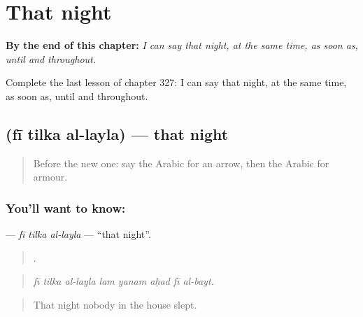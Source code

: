 
\chapter{That night}
\label{ch:ar-that-night}

\begin{chapteropening}
\textbf{By the end of this chapter:} \emph{I can say that night, at the same time, as soon as, until and throughout.}

Complete the last lesson of chapter 327: I can say that night, at the same time, as soon as, until and throughout.
\end{chapteropening}

\section[\texorpdfstring{\ar{في} \ar{تلك} \ar{الليلة} (fī tilka al-layla)}{في تلك الليلة (fī tilka al-layla)}]{   (fī tilka al-layla) — that night}

\label{lesson:AR-C327-fi-tilka-al-layla}



\begin{quote}
Before the new one: say the Arabic for an arrow, then the Arabic for armour.
\end{quote}

\subsection*{You'll want to know:   }
\textbf{  } — \emph{fī tilka al-layla} — \textquotedblleft{}that night\textquotedblright{}.

\begin{quote}
       .
\end{quote}

\begin{quote}
\emph{fī tilka al-layla lam yanam aḥad fī al-bayt.}
\end{quote}

\begin{quote}
That night nobody in the house slept.
\end{quote}

